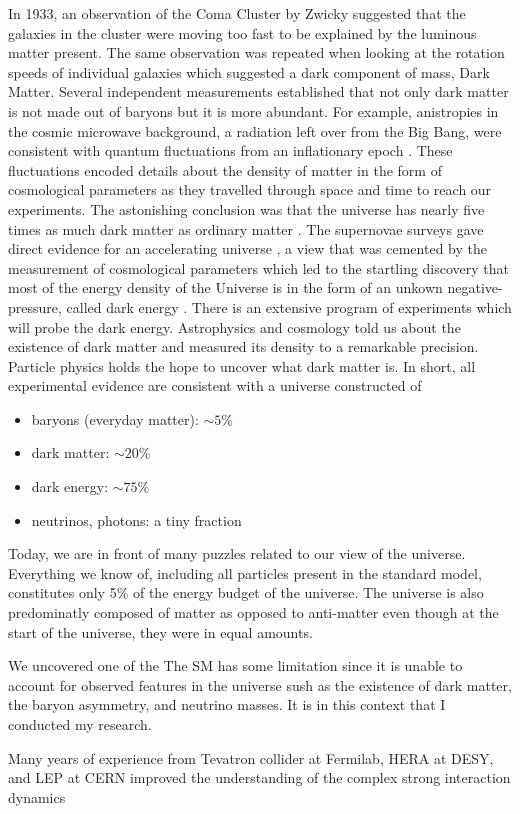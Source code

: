 In 1933, an observation of the Coma Cluster by Zwicky suggested that the galaxies in the cluster were moving too fast to be explained 
by the luminous matter present. The same observation was repeated when looking at the rotation speeds of individual galaxies which 
suggested a dark component of mass, Dark Matter. 
Several independent measurements established that 
not only dark matter is not made out of baryons but it is more 
abundant. 
For example, anistropies in the cosmic microwave background, a radiation 
left over from the Big Bang, were consistent with 
quantum fluctuations from an inflationary epoch \cite{Hu:2001bc,2009AIPC}. 
These fluctuations encoded details about the density of matter 
in the form of 
cosmological parameters as they travelled through space and time to reach 
our experiments.
The astonishing conclusion was that the universe has nearly five times 
as much dark matter as ordinary matter \cite{Bertone:2004pz}.
The supernovae surveys gave direct evidence for an accelerating universe
 \cite{Perlmutter:1998np},
a view that was cemented by the measurement of cosmological parameters
\cite{Adam:2015rua,Ade:2015xua}
which led to the startling discovery that most of the energy density of 
the Universe is in the 
form of an unkown negative-pressure, called dark energy \cite{Scranton:2003in}.
There is an extensive program of experiments 
which will probe the dark energy.%
Astrophysics and cosmology told us about 
the existence of dark matter and measured its density to a remarkable 
precision. Particle physics holds the hope to uncover what dark matter is.
In short, all experimental evidence are consistent with a universe 
constructed of 
\begin{itemize}
\item baryons (everyday matter): $\sim 5\%$ 
\item dark matter: $\sim 20\%$ 
\item dark energy: $\sim 75\%$ 
\item neutrinos, photons: a tiny fraction
\end{itemize}

Today, we are in front of many puzzles related to our view of the universe.
Everything we know of, including all particles present in the standard model, 
constitutes only 5\% of the energy budget of the universe. 
The universe is also predominatly composed of matter as opposed to 
anti-matter even though  at the start of the universe, they were in equal 
amounts.  



We uncovered one of the 
The SM has some limitation since it is unable to account for observed features in the universe sush as the existence of dark matter, 
the baryon asymmetry, and neutrino masses. It is in this context that I conducted my research.

Many years of experience from Tevatron collider at Fermilab, HERA at DESY, and LEP at CERN improved the understanding of the 
complex strong interaction dynamics 


